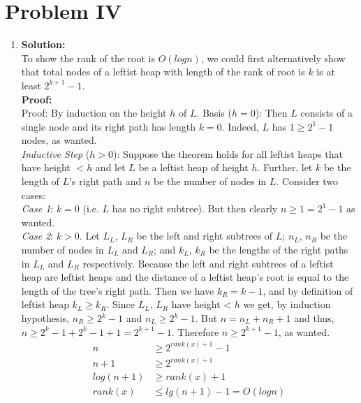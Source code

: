 \section{Problem IV}

\begin{enumerate}[label=(\alph*)]
	\item \textbf{Solution:} \\
	To show the rank of the root is $O(logn)$, we could first alternatively show that total nodes of a leftist heap with length of the rank of root is $k$ is at least $2^{k + 1} - 1$.\\
	\textbf{Proof:}\\
	Proof: By induction on the height $h$ of $L$.
	Basis ($h=0$): Then $L$ consists of a single node and its right path has length $k=0$. Indeed, $L$ has $1 \geq 2^{1} - 1$ nodes, as wanted.\\
	\textit{Inductive Step} ($h>0$): Suppose the theorem holds for all leftist heaps that have height $< h$
	and let $L$ be a leftist heap of height $h$. Further, let $k$ be the length of $L$'s right path and $n$
	be the number of nodes in $L$. Consider two cases:\\
	\textit{Case 1}: $k=0$ (i.e. $L$ has no right subtree). But then clearly $n \geq 1 = 2^1 - 1$ as wanted.\\
	\textit{Case 2}: $k>0$. Let $L_L$, $L_R$ be the left and right subtrees of $L$; $n_L$, $n_R$ be the number of
	nodes in $L_L$ and $L_R$; and $k_L$, $k_R$ be the lengths of the right paths in $L_L$ and $L_R$ respectively. Because the left and right subtrees of a leftist heap are leftist heaps and the distance of a leftist heap's root is equal to the length of the tree's right path. Then we have $k_R = k - 1$, and by definition of leftist heap $k_L \geq k_R$. Since $L_L$, $L_R$ have height < $h$ we get, by induction hypothesis, $n_R \geq 2^k - 1$ and $n_L \geq 2^k - 1$. But $n = n_L + n_R +1$ and thus, $n \geq 2^k - 1 + 2^k - 1 + 1 =2^{k+1} - 1$. Therefore $n \geq 2^{k+1} - 1$, as wanted. 
	\begin{align*}
	n &\geq 2^{rank(x) + 1} - 1\\
	n + 1 &\geq 2^{rank(x) + 1}\\
	log(n + 1) &\geq rank(x) + 1\\
	rank(x) &\leq lg(n + 1) - 1 = O(logn) 
	\end{align*}


\end{enumerate}
